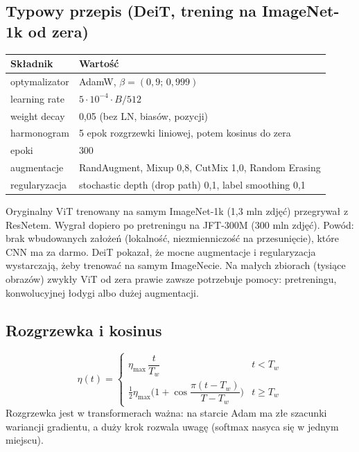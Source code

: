 \documentclass[11pt,a4paper]{article}
\begin{document}
\subsection{Typowy przepis (DeiT, trening na ImageNet-1k od zera)}
\begin{center}
\begin{tabular}{@{}ll@{}}
\toprule
Składnik & Wartość \\
\midrule
optymalizator & AdamW, $\beta=(0{,}9;\,0{,}999)$ \\
learning rate & $5\cdot10^{-4}\cdot B/512$ \\
weight decay & 0,05 (bez LN, biasów, pozycji) \\
harmonogram & 5 epok rozgrzewki liniowej, potem kosinus do zera \\
epoki & 300 \\
augmentacje & RandAugment, Mixup 0,8, CutMix 1,0, Random Erasing \\
regularyzacja & stochastic depth (drop path) 0,1, label smoothing 0,1 \\
\bottomrule
\end{tabular}
\end{center}

\begin{uwaga}
Oryginalny ViT trenowany na samym ImageNet-1k (1,3 mln zdjęć) przegrywał z ResNetem. Wygrał dopiero
po pretreningu na JFT-300M (300 mln zdjęć). Powód: brak wbudowanych założeń (lokalność, niezmienniczość
na przesunięcie), które CNN ma za darmo. DeiT pokazał, że mocne augmentacje i regularyzacja
wystarczają, żeby trenować na samym ImageNecie. Na małych zbiorach (tysiące obrazów) zwykły ViT
od zera prawie zawsze potrzebuje pomocy: pretreningu, konwolucyjnej łodygi albo dużej augmentacji.
\end{uwaga}

\subsection{Rozgrzewka i kosinus}
\[
\eta(t)=\begin{cases}\eta_{\max}\,\dfrac{t}{T_w} & t<T_w\\[2mm]
\tfrac12\eta_{\max}\Big(1+\cos\dfrac{\pi(t-T_w)}{T-T_w}\Big) & t\ge T_w\end{cases}
\]
Rozgrzewka jest w transformerach ważna: na starcie Adam ma złe szacunki wariancji gradientu, a duży
krok rozwala uwagę (softmax nasyca się w jednym miejscu).
\end{document}
